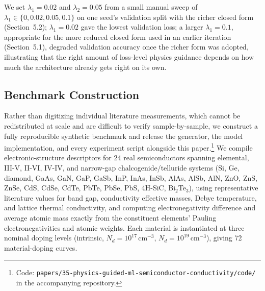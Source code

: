 \documentclass[11pt]{article}
\begin{document}
We set $\lambda_1 = 0.02$ and $\lambda_2 = 0.05$ from a small manual sweep of $\lambda_1 \in \{0, 0.02, 0.05, 0.1\}$ on one seed's validation split with the richer closed form (Section~5.2); $\lambda_1=0.02$ gave the lowest validation loss; a larger $\lambda_1=0.1$, appropriate for the more reduced closed form used in an earlier iteration (Section~5.1), degraded validation accuracy once the richer form was adopted, illustrating that the right amount of loss-level physics guidance depends on how much the architecture already gets right on its own.

\subsection{Benchmark Construction}

Rather than digitizing individual literature measurements, which cannot be redistributed at scale and are difficult to verify sample-by-sample, we construct a fully reproducible synthetic benchmark and release the generator, the model implementation, and every experiment script alongside this paper.\footnote{Code: \texttt{papers/35-physics-guided-ml-semiconductor-conductivity/code/} in the accompanying repository.} We compile electronic-structure descriptors for 24 real semiconductors spanning elemental, III-V, II-VI, IV-IV, and narrow-gap chalcogenide/telluride systems (Si, Ge, diamond, GaAs, GaN, GaP, GaSb, InP, InAs, InSb, AlAs, AlSb, AlN, ZnO, ZnS, ZnSe, CdS, CdSe, CdTe, PbTe, PbSe, PbS, 4H-SiC, Bi$_2$Te$_3$), using representative literature values for band gap, conductivity effective masses, Debye temperature, and lattice thermal conductivity, and computing electronegativity difference and average atomic mass exactly from the constituent elements' Pauling electronegativities and atomic weights. Each material is instantiated at three nominal doping levels (intrinsic, $N_d=10^{17}\,\text{cm}^{-3}$, $N_d=10^{19}\,\text{cm}^{-3}$), giving 72 material-doping curves.
\end{document}
